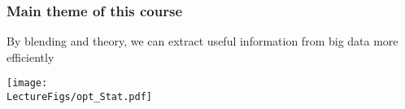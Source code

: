 \documentclass[compress,
mathserif,wide,%
]{beamer}
\begin{document}
\begin{frame}
  \frametitle{Main theme of this course}

  By blending  and  theory, we can extract useful information from big data more efficiently

\vfill
  \begin{center}
    \texttt{[image: \\LectureFigs/opt\_Stat.pdf]}
\end{center}

\end{frame}
%
%
%
%
%
%
%
%
%
%
%
%
%
%
%
%
%
%
%
%
%
%
%
%
%
%
%
%
%
%
%
%
\end{document}
